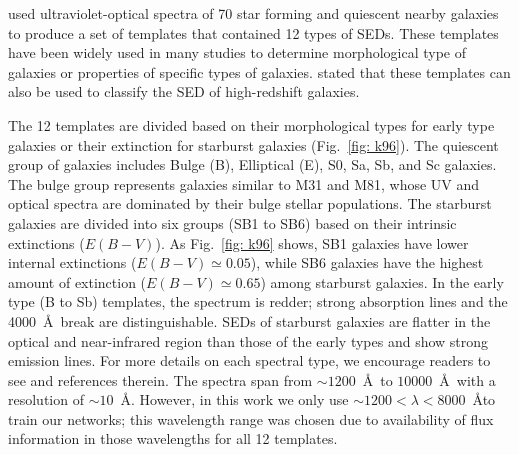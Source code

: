      used ultraviolet-optical spectra of 70 star forming and quiescent nearby galaxies to produce a set of templates that contained 12 types of SEDs.
    These templates have been widely used in many studies to determine morphological type of galaxies or properties of specific types of galaxies\citep[e.g.][]{Shakouri16,Paiano16,Laporte16,Holden16}.
     stated that these templates can also be used to classify the SED of high-redshift galaxies. 
    
    The 12 templates are divided based on their morphological types for early type galaxies or their extinction for starburst galaxies (Fig.~\ref{fig: k96}). 
    The quiescent group of galaxies includes Bulge (B), Elliptical (E), S0, Sa, Sb, and Sc galaxies.
    The bulge group represents galaxies similar to M31 and M81, whose UV and optical spectra are dominated by their bulge stellar populations.
    The starburst galaxies are divided into six groups (SB1 to SB6) based on their intrinsic extinctions ($E(B-V)$). 
    As Fig.~\ref{fig: k96} shows, SB1 galaxies have lower internal extinctions ($E(B-V) \simeq 0.05$), while SB6 galaxies have the highest amount of extinction ($E(B-V) \simeq 0.65$) among starburst galaxies. 
   In the early type (B to Sb) templates, the spectrum is redder; strong absorption lines and the 4000~\AA~break are distinguishable.
    SEDs of starburst galaxies are flatter in the optical and near-infrared region than those of the early types and show strong emission lines.
    For more details on each spectral type, we encourage readers to see  and references therein. 
   The  spectra span from $\sim1200$~\AA~to $10000$~\AA~with a resolution of $\sim 10$~\AA.
    However, in this work we only use $\sim1200< \lambda < 8000$~\AA to train our networks; 
    this wavelength range was chosen due to availability of flux information in those wavelengths for all 12 templates. 

